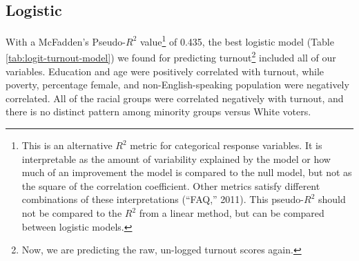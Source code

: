 \documentclass[12pt,twoside]{reedthesis}
\begin{document}
\hypertarget{logistic}{%
\subsection{Logistic}\label{logistic}}

With a McFadden's Pseudo-\(R^2\) value\footnote{This is an alternative \(R^2\) metric for categorical response variables. It is interpretable as the amount of variability explained by the model or how much of an improvement the model is compared to the null model, but not as the square of the correlation coefficient. Other metrics satisfy different combinations of these interpretations (``FAQ,'' 2011). This pseudo-\(R^2\) should not be compared to the \(R^2\) from a linear method, but can be compared between logistic models.} of 0.435, the best logistic model (Table \ref{tab:logit-turnout-model}) we found for predicting turnout\footnote{Now, we are predicting the raw, un-logged turnout scores again.} included all of our variables. Education and age were positively correlated with turnout, while poverty, percentage female, and non-English-speaking population were negatively correlated. All of the racial groups were correlated negatively with turnout, and there is no distinct pattern among minority groups versus White voters.
\end{document}
